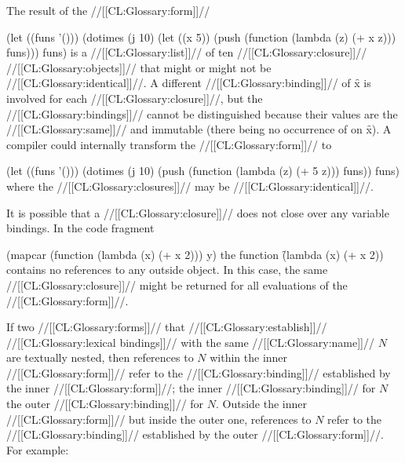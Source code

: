 The result of the //[[CL:Glossary:form]]//
 
\code
 (let ((funs '()))
   (dotimes (j 10)
     (let ((x 5))
       (push (function (lambda (z) (+ x z)))
            funs)))
   funs)
\endcode
is a //[[CL:Glossary:list]]// of ten //[[CL:Glossary:closure]]// //[[CL:Glossary:objects]]// that
might or might not be //[[CL:Glossary:identical]]//.
A different //[[CL:Glossary:binding]]// of \f{x} is involved for
each //[[CL:Glossary:closure]]//, but the //[[CL:Glossary:bindings]]// cannot be distinguished
because their values are the //[[CL:Glossary:same]]// and immutable (there being no occurrence
of  on \f{x}).  A compiler could internally
transform the //[[CL:Glossary:form]]// to
 
\code
 (let ((funs '()))
   (dotimes (j 10)
     (push (function (lambda (z) (+ 5 z)))
           funs))
  funs)
\endcode
where the //[[CL:Glossary:closures]]// may be //[[CL:Glossary:identical]]//.





 

It is possible that a //[[CL:Glossary:closure]]// does not
close over any variable bindings.
In the code fragment
 
\code
 (mapcar (function (lambda (x) (+ x 2))) y)
\endcode
the function \f{(lambda (x) (+ x 2))} contains no references to any outside
object. In this case, the same //[[CL:Glossary:closure]]// might be returned
for all evaluations of the  //[[CL:Glossary:form]]//.

\endSubsection%
 












If two //[[CL:Glossary:forms]]// that //[[CL:Glossary:establish]]// //[[CL:Glossary:lexical bindings]]// with
the same //[[CL:Glossary:name]]// $N$ are textually nested, then references to $N$
within the inner //[[CL:Glossary:form]]// refer to the //[[CL:Glossary:binding]]// established by
the inner //[[CL:Glossary:form]]//; the inner //[[CL:Glossary:binding]]// for $N$
 the outer //[[CL:Glossary:binding]]// for $N$.  Outside the inner
//[[CL:Glossary:form]]// but inside the outer one, references to $N$ refer to the
//[[CL:Glossary:binding]]// established by the outer //[[CL:Glossary:form]]//.  For example:





